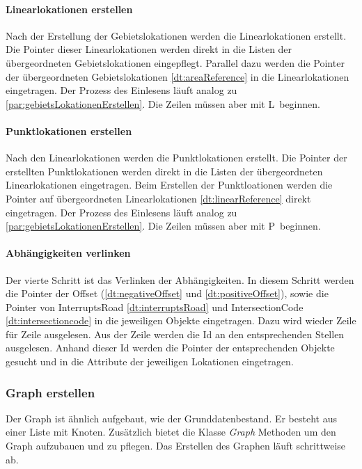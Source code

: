 \documentclass[12pt, a4paper, ngerman]{article}
\begin{document}
\paragraph{Linearlokationen erstellen}
Nach der Erstellung der Gebietslokationen werden die Linearlokationen erstellt. Die Pointer dieser Linearlokationen werden direkt in die Listen der übergeordneten Gebietslokationen eingepflegt. Parallel dazu werden die Pointer der übergeordneten Gebietslokationen \ref{dt:areaReference} in die Linearlokationen eingetragen. Der Prozess des Einlesens läuft analog zu \ref{par:gebietsLokationenErstellen}. Die Zeilen müssen aber mit \glqq L\grqq~beginnen. 

\paragraph{Punktlokationen erstellen}
Nach den Linearlokationen werden die Punktlokationen erstellt. Die Pointer der erstellten Punktlokationen werden direkt in die Listen der übergeordneten Linearlokationen eingetragen. Beim Erstellen der Punktloationen werden die Pointer auf übergeordneten Linearlokationen \ref{dt:linearReference} direkt eingetragen. Der Prozess des Einlesens läuft analog zu \ref{par:gebietsLokationenErstellen}. Die Zeilen müssen aber mit \glqq P\grqq~beginnen. 


\paragraph{Abhängigkeiten verlinken} 
Der vierte Schritt ist das Verlinken der Ab\-häng\-ig\-keit\-en. In diesem Schritt werden die Pointer der Offset (\ref{dt:negativeOffset} und \ref{dt:positiveOffset}), sowie die Pointer von InterruptsRoad \ref{dt:interruptsRoad} und IntersectionCode \ref{dt:intersectioncode} in die jeweiligen Objekte eingetragen. Dazu wird wieder Zeile für Zeile ausgelesen. Aus der Zeile werden die Id an den entsprechenden Stellen ausgelesen. Anhand dieser Id werden die Pointer der entsprechenden Objekte gesucht und in die Attribute der jeweiligen Lokationen eingetragen.

\subsubsection{Graph erstellen}
Der Graph ist ähnlich aufgebaut, wie der Grunddatenbestand. Er besteht aus einer Liste mit Knoten. Zusätzlich bietet die Klasse \textit{Graph}  Methoden um den Graph aufzubauen und zu pflegen. Das Erstellen des Graphen läuft schrittweise ab.
\end{document}
